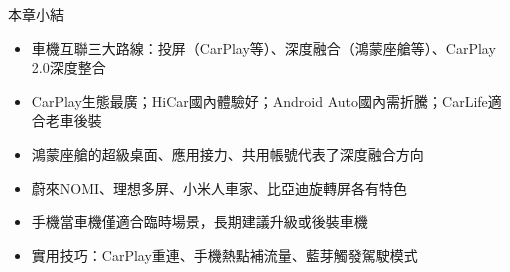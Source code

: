 \begin{tcbsummary}{本章小結}
\begin{itemize}
  \item 車機互聯三大路線：投屏（CarPlay等）、深度融合（鴻蒙座艙等）、CarPlay 2.0深度整合
  \item CarPlay生態最廣；HiCar國內體驗好；Android Auto國內需折騰；CarLife適合老車後裝
  \item 鴻蒙座艙的超級桌面、應用接力、共用帳號代表了深度融合方向
  \item 蔚來NOMI、理想多屏、小米人車家、比亞迪旋轉屏各有特色
  \item 手機當車機僅適合臨時場景，長期建議升級或後裝車機
  \item 實用技巧：CarPlay重連、手機熱點補流量、藍芽觸發駕駛模式
\end{itemize}

\end{tcbsummary}
